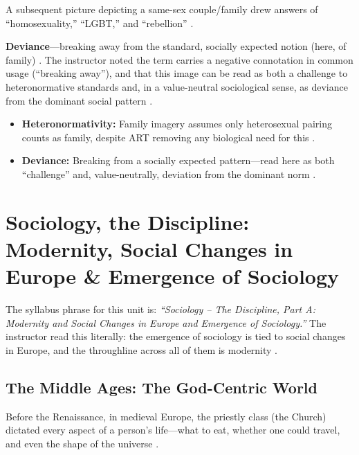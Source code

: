 A subsequent picture depicting a same-sex couple/family drew answers of ``homosexuality,'' ``LGBT,'' and ``rebellion'' .

\begin{KeyConcept}
\textbf{Deviance}---breaking away from the standard, socially expected notion (here, of family) . The instructor noted the term carries a negative connotation in common usage (``breaking away''), and that this image can be read as both a challenge to heteronormative standards and, in a value-neutral sociological sense, as deviance from the dominant social pattern .
\end{KeyConcept}

\begin{QuickRevision}
\begin{itemize}
    \item \textbf{Heteronormativity:} Family imagery assumes only heterosexual pairing counts as family, despite ART removing any biological need for this .
    \item \textbf{Deviance:} Breaking from a socially expected pattern---read here as both ``challenge'' and, value-neutrally, deviation from the dominant norm .
\end{itemize}
\end{QuickRevision}

\sectiondivider

\section{Sociology, the Discipline: Modernity, Social Changes in Europe \& Emergence of Sociology}

The syllabus phrase for this unit is: \textit{``Sociology -- The Discipline, Part A: Modernity and Social Changes in Europe and Emergence of Sociology.''} The instructor read this literally: the emergence of sociology is tied to social changes in Europe, and the throughline across all of them is modernity .

\subsection{The Middle Ages: The God-Centric World}
Before the Renaissance, in medieval Europe, the priestly class (the Church) dictated every aspect of a person's life---what to eat, whether one could travel, and even the shape of the universe .

